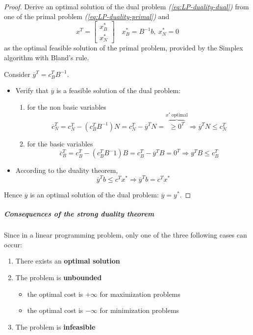 \documentclass[english]{article}
\begin{document}
\begin{proof}
  Derive an optimal solution of the dual problem \textit{(\ref{eq:LP-duality-dual})} from one of the primal problem \textit{(\ref{eq:LP-duality-primal})} and
  \[ x^T = \begin{bmatrix}
      x_B^\ast \\ x_N^\ast
    \end{bmatrix} \quad x^\ast_B = B^{-1} b, \ x_N^\ast = 0 \]
  as the optimal feasible solution of the primal problem, provided by the Simplex algorithm with Bland's rule.

  Consider \(\overline{y}^T = c_B^T B^{-1}\).
  \begin{itemize}
    \item Verify that \(\overline{y}\) is a feasible solution of the dual problem:
          \begin{enumerate}
            \item for the non basic variables \[ \overline{c}_N^T = c_N^T - \left( c_B^T B^{-1} \right) N = c_N^T - \overline{y}^T N = \displaystyle \overbrace{\geq 0^T}^{x^\ast \ \text{optimal}} \Rightarrow \overline{y}^T N \leq c_N^T \]
            \item for the basic variables \[ \overline{c}_B^T = c_B^T - \left( c_B^T B^-1 \right) B = c_B^T - \overline{y}^T B = 0^T \Rightarrow y^T B \leq c_B^T \]
          \end{enumerate}
    \item According to the duality theorem, \[ \overline{y}^T b \leq c^T x^\ast \Rightarrow \overline{y}^T b = c^T x^\ast \]
  \end{itemize}

  Hence \(\overline{y}\) is an optimal solution of the dual problem: \(\overline{y} = y^\ast\).
\end{proof}

\subparagraph*{Consequences of the strong duality theorem}

Since in a linear programming problem, only one of the three following cases can occur:

\begin{enumerate}
  \item There exists an \textbf{optimal solution}
  \item The problem is \textbf{unbounded}
        \begin{itemize}
          \item the optimal cost is \(+\infty\) for maximization problems
          \item the optimal cost is \(-\infty\) for minimization problems
        \end{itemize}
  \item The problem is \textbf{infeasible}
\end{enumerate}
\end{document}
